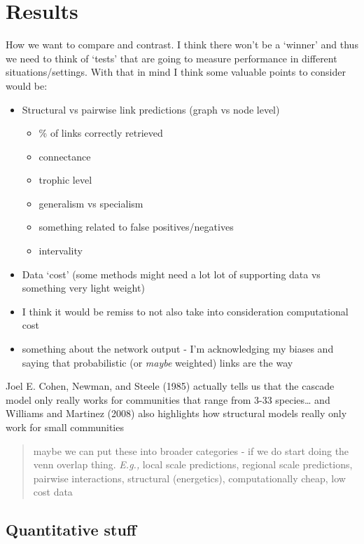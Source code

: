 \documentclass[
  letterpaper,
  DIV=11,
  numbers=noendperiod]{scrartcl}
\providecommand{\tightlist}{%
  \setlength{\itemsep}{0pt}\setlength{\parskip}{0pt}}\usepackage{longtable,booktabs,array}
\begin{document}
\section{Results}\label{results}

How we want to compare and contrast. I think there won't be a `winner'
and thus we need to think of `tests' that are going to measure
performance in different situations/settings. With that in mind I think
some valuable points to consider would be:

\begin{itemize}
\tightlist
\item
  Structural vs pairwise link predictions (graph vs node level)

  \begin{itemize}
  \tightlist
  \item
    \% of links correctly retrieved
  \item
    connectance
  \item
    trophic level
  \item
    generalism vs specialism
  \item
    something related to false positives/negatives
  \item
    intervality
  \end{itemize}
\item
  Data `cost' (some methods might need a lot lot of supporting data vs
  something very light weight)
\item
  I think it would be remiss to not also take into consideration
  computational cost
\item
  something about the network output - I'm acknowledging my biases and
  saying that probabilistic (or \emph{maybe} weighted) links are the way
\end{itemize}

Joel E. Cohen, Newman, and Steele (1985) actually tells us that the
cascade model only really works for communities that range from 3-33
species\ldots{} and Williams and Martinez (2008) also highlights how
structural models really only work for small communities

\begin{quote}
maybe we can put these into broader categories - if we do start doing
the venn overlap thing. \emph{E.g.,} local scale predictions, regional
scale predictions, pairwise interactions, structural (energetics),
computationally cheap, low cost data
\end{quote}

\subsection{Quantitative stuff}\label{quantitative-stuff}
\end{document}

